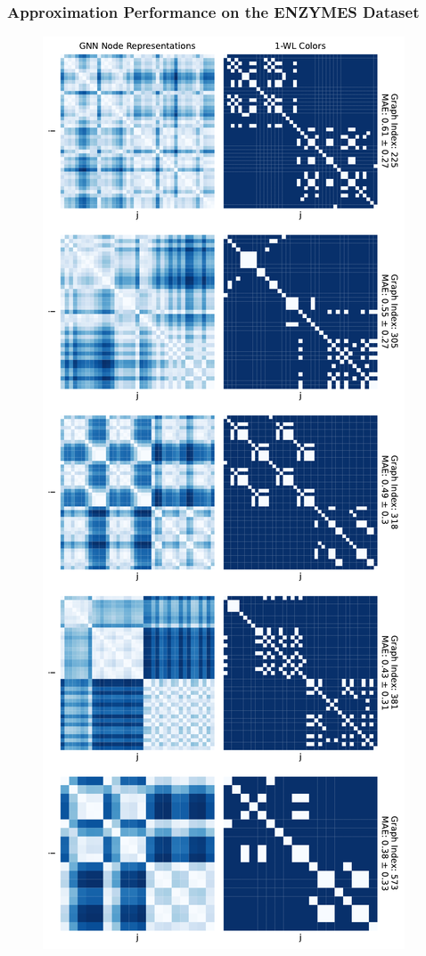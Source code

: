 \subsubsection{\gnn Approximation Performance on the ENZYMES Dataset}

\begin{figure}[H]
    \centering
    \begin{minipage}[b]{0.45992852703\textwidth}
        \centering
        \includegraphics[width=\textwidth, left]{Figures/heatmaps_ENZYMES_0.pdf}

\end{minipage}
\end{figure}
